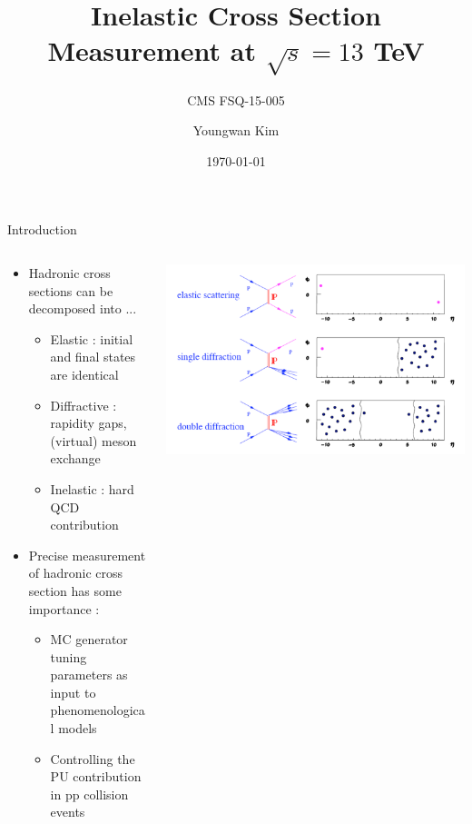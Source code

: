 \documentclass[aspectratio=169,xcolor=dvipsnames]{beamer}
\title[short title]{Inelastic Cross Section Measurement at $\sqrt{s}=13$ TeV} %
\subtitle{CMS FSQ-15-005}
\author[Youngwan Kim] {Youngwan Kim}
\institute[SNUCMS] %
{
	Seoul National University\vskip0.05in
	SNUCMS arXiv Seminar
    \vskip 3pt
}
\date{\today} %
\begin{document}
\begin{frame}
    \titlepage
\end{frame}




\begin{frame}{Introduction}
	\begin{columns}[T]
		\begin{column}{.5\textwidth}
			\begin{itemize}
				\item Hadronic cross sections can be decomposed into ...
				\begin{itemize}
					\item Elastic : initial and final states are identical
					\item Diffractive : rapidity gaps, (virtual) meson exchange
					\item Inelastic : hard QCD contribution
				\end{itemize} \vspace{0.15in}	
				\item Precise measurement of hadronic cross section has some importance :
				\begin{itemize}
					\item MC generator tuning parameters as input to phenomenological models
					\item Controlling the PU contribution in pp collision events
				\end{itemize}
			\end{itemize}
		\end{column}
		\begin{column}{.5\textwidth}
			\centering
			\vspace{0.2in}
			\includegraphics[width=\textwidth]{interactions.png}
		\end{column}
	\end{columns}
\end{frame}
\end{document}
